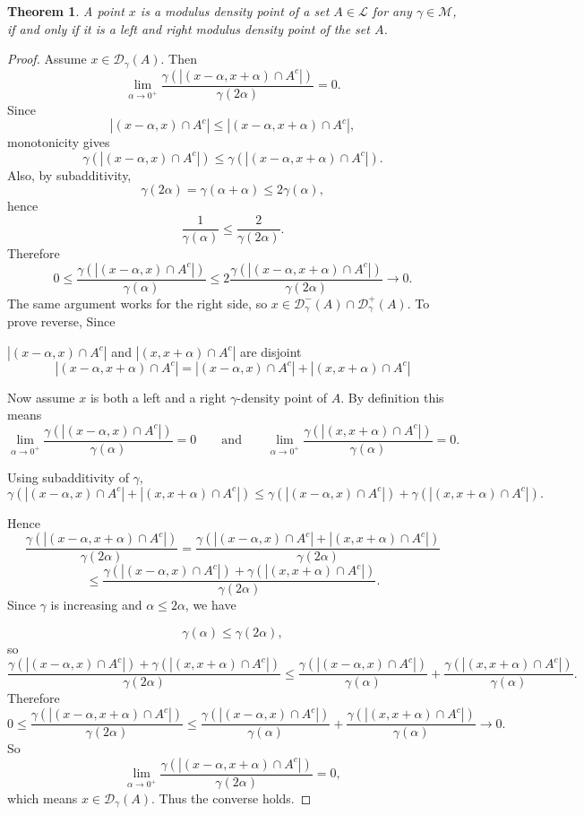 \documentclass{amsart}
\newtheorem{theorem}{Theorem}
\theoremstyle{plain}
\numberwithin{equation}{section}
\begin{document}
\begin{theorem}
A point $x$ is a modulus density point of a set $A\in \mathcal{L}$ for any $\gamma \in \mathcal{M}$, if and only if it is a left and right modulus density point of the set $A$.
 \end{theorem}
 
\begin{proof} 
Assume \(x\in \mathcal{D}_\gamma(A)\). Then
$$
\lim_{\alpha\to 0^+}
\frac{\gamma(|(x-\alpha,x+\alpha)\cap A^c|)}{\gamma(2\alpha)}
=0.
$$
Since
$$
|(x-\alpha,x)\cap A^c|
\leq
|(x-\alpha,x+\alpha)\cap A^c|,
$$
monotonicity gives
$$
\gamma(|(x-\alpha,x)\cap A^c|)
\leq
\gamma(|(x-\alpha,x+\alpha)\cap A^c|).
$$
Also, by subadditivity,
$$
\gamma(2\alpha)=\gamma(\alpha+\alpha)\leq 2\gamma(\alpha),
$$
hence
$$
\frac{1}{\gamma(\alpha)}\leq \frac{2}{\gamma(2\alpha)}.
$$
Therefore
$$
0\leq
\frac{\gamma(|(x-\alpha,x)\cap A^c|)}{\gamma(\alpha)}
\leq
2\frac{\gamma(|(x-\alpha,x+\alpha)\cap A^c|)}{\gamma(2\alpha)}
\to 0.
$$
The same argument works for the right side, so \(x\in \mathcal{D}_\gamma^{-}(A)\cap \mathcal{D}_\gamma^{+}(A)\).
To prove reverse, 
Since

$|(x-\alpha,x)\cap A^c|$ and $|(x,x+\alpha)\cap A^c|$ are disjoint
$$|(x-\alpha,x+\alpha)\cap A^c|=|(x-\alpha,x)\cap A^c|+|(x,x+\alpha)\cap A^c|$$

Now assume \(x\) is both a left and a right \(\gamma\)-density point of \(A\). By definition this means
$$\lim_{\alpha\to 0^+}\frac{\gamma(|(x-\alpha,x)\cap A^c|)}{\gamma(\alpha)}=0
\qquad \text{and} \qquad
\lim_{\alpha\to 0^+}\frac{\gamma(|(x,x+\alpha)\cap A^c|)}{\gamma(\alpha)}=0.$$

Using subadditivity of \(\gamma\),
$$\gamma(|(x-\alpha,x)\cap A^c|+|(x,x+\alpha)\cap A^c|)\le \gamma(|(x-\alpha,x)\cap A^c|)+\gamma(|(x,x+\alpha)\cap A^c|).$$

Hence
$$\frac{\gamma(|(x-\alpha,x+\alpha)\cap A^c|)}{\gamma(2\alpha)}
= \frac{\gamma(|(x-\alpha,x)\cap A^c|+|(x,x+\alpha)\cap A^c|)}{\gamma(2\alpha)}
$$ $$\le \frac{\gamma(|(x-\alpha,x)\cap A^c|)+\gamma(|(x,x+\alpha)\cap A^c|)}{\gamma(2\alpha)}.$$
Since \(\gamma\) is increasing and \(\alpha \leq 2\alpha\), we have

$$\gamma(\alpha)\leq \gamma(2\alpha),$$
so
$$\frac{\gamma(|(x-\alpha,x)\cap A^c|)+\gamma(|(x,x+\alpha)\cap A^c|)}{\gamma(2\alpha)}
\leq \frac{\gamma(|(x-\alpha,x)\cap A^c|)}{\gamma(\alpha)}+\frac{\gamma(|(x,x+\alpha)\cap A^c|)}{\gamma(\alpha)}.$$
Therefore
$$ 0\leq
\frac{\gamma(|(x-\alpha,x+\alpha)\cap A^c|)}{\gamma(2\alpha)} \leq \frac{\gamma(|(x-\alpha,x)\cap A^c|)}{\gamma(\alpha)}+\frac{\gamma(|(x,x+\alpha)\cap A^c|)}{\gamma(\alpha)}
\longrightarrow 0. $$
So $$\lim_{\alpha\to 0^+} \frac{\gamma(|(x-\alpha,x+\alpha)\cap A^c|)}{\gamma(2\alpha)}=0,$$
which means \(x\in \mathcal{D}_\gamma(A)\). Thus the converse holds.
\end{proof}
\end{document}
